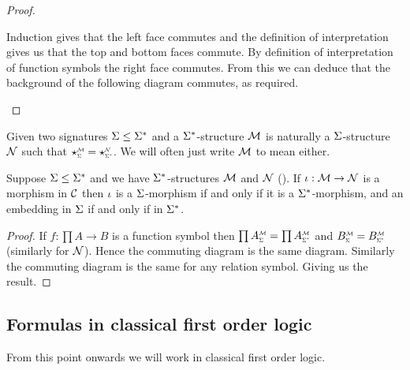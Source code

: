 \begin{proof}
\begin{itemize}
\begin{cd}
            \ar["{\mmintp{f}}"{description}, from=2-2, to=1-3]
            \ar[
                "{\io_{B_1} \tdt \io_{B_n}}"{description, pos=0.2}, 
                from=2-2, to=4-2, crossing over]
            \ar["{\io_B}", from=1-3, to=3-3]
        \end{cd}
        Induction gives that the left face commutes and the definition 
        of interpretation gives us that the top and bottom faces commute.
        By definition of interpretation of function 
        symbols the right face commutes.
        From this we can deduce that the background of the following diagram 
        commutes, as required. 
    \end{itemize}
\end{proof}

\begin{dfn}
    Given two signatures
    $\Sigma \leq \Sigma^*$ and
    a $\Sigma^*$-structure $\mathcal{M}$ is naturally a $\Sigma$-structure $\mathcal{N}$ such that 
    $\subintp{\Si}{\MM}{\star} = \subintp{\Si^*}{\NN}{\star}$.
    We will often just write $\mathcal{M}$ to mean either.
\end{dfn}

\begin{prop}
    Suppose $\Sigma \leq \Sigma^*$
    and we have $\Sigma^*$-structures $\mathcal{M}$ and $\mathcal{N}$ 
    ().
    If $\iota : \mathcal{M} \to \mathcal{N}$ is a morphism in $\mathcal{C}$ then
    $\iota$ is a $\Sigma$-morphism if and only if it is a $\Sigma^*$-morphism, and
    an embedding in $\Sigma$ if and only if in $\Sigma^*$.
\end{prop}
\begin{proof}
    If $f : \prod A \to B$ is a function symbol 
    then $\prod \subintp{\Si}{\MM}{A} = \prod \subintp{\Si^*}{\MM}{A}$
    and $\subintp{\Si}{\MM}{B} = \subintp{\Si^*}{\MM}{B}$ 
    (similarly for $\mathcal{N}$).
    Hence the commuting diagram is the same diagram.
    Similarly the commuting diagram is the same for any relation symbol.
    Giving us the result.
\end{proof}

\subsection{Formulas in classical first order logic}
From this point onwards we will work in classical first order logic.

